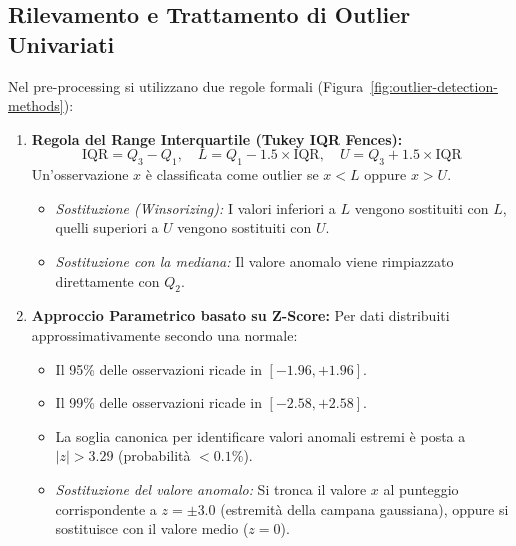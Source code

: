 \subsection{Rilevamento e Trattamento di Outlier Univariati}
Nel pre-processing si utilizzano due regole formali (Figura~\ref{fig:outlier-detection-methods}):
\begin{enumerate}
    \item \textbf{Regola del Range Interquartile (Tukey IQR Fences):}
    \begin{equation}
    \text{IQR} = Q_3 - Q_1, \quad L = Q_1 - 1.5 \times \text{IQR}, \quad U = Q_3 + 1.5 \times \text{IQR}
    \end{equation}
    Un'osservazione $x$ è classificata come outlier se $x < L$ oppure $x > U$.
    \begin{itemize}
        \item \textit{Sostituzione (Winsorizing):} I valori inferiori a $L$ vengono sostituiti con $L$, quelli superiori a $U$ vengono sostituiti con $U$.
        \item \textit{Sostituzione con la mediana:} Il valore anomalo viene rimpiazzato direttamente con $Q_2$.
    \end{itemize}
    \item \textbf{Approccio Parametrico basato su Z-Score:}
    Per dati distribuiti approssimativamente secondo una normale:
    \begin{itemize}
        \item Il 95\% delle osservazioni ricade in $[ -1.96, +1.96 ]$.
        \item Il 99\% delle osservazioni ricade in $[ -2.58, +2.58 ]$.
        \item La soglia canonica per identificare valori anomali estremi è posta a $|z| > 3.29$ (probabilità $< 0.1\%$).
        \item \textit{Sostituzione del valore anomalo:} Si tronca il valore $x$ al punteggio corrispondente a $z = \pm 3.0$ (estremità della campana gaussiana), oppure si sostituisce con il valore medio ($z = 0$).
    \end{itemize}
\end{enumerate}

